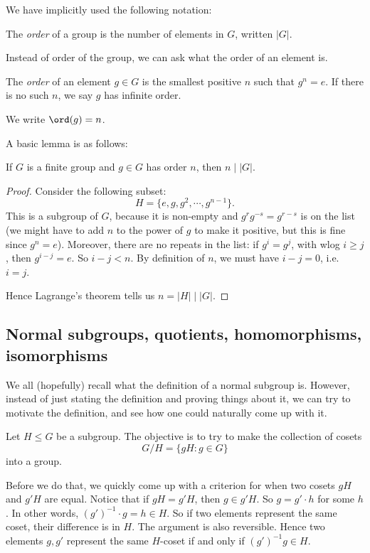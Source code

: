 \documentclass[a4paper]{article}
\begin{document}
We have implicitly used the following notation:
\begin{defi}
  The \emph{order} of a group is the number of elements in $G$, written $|G|$.
\end{defi}

Instead of order of the group, we can ask what the order of an element is.
\begin{defi}
  The \emph{order} of an element $g \in G$ is the smallest positive $n$ such that $g^n = e$. If there is no such $n$, we say $g$ has infinite order.

  We write $\ord(g) = n$.
\end{defi}

A basic lemma is as follows:
\begin{lemma}
  If $G$ is a finite group and $g \in G$ has order $n$, then $n \mid |G|$.
\end{lemma}

\begin{proof}
  Consider the following subset:
  \[
    H= \{e, g, g^2, \cdots, g^{n - 1}\}.
  \]
  This is a subgroup of $G$, because it is non-empty and $g^rg^{-s} = g^{r - s}$ is on the list (we might have to add $n$ to the power of $g$ to make it positive, but this is fine since $g^n = e$). Moreover, there are no repeats in the list: if $g^i = g^j$, with wlog $i \geq j$, then $g^{i - j} = e$. So $i - j < n$. By definition of $n$, we must have $i - j = 0$, i.e.\ $i = j$.

  Hence Lagrange's theorem tells us $n = |H| \mid |G|$.
\end{proof}

\subsection{Normal subgroups, quotients, homomorphisms, isomorphisms}
We all (hopefully) recall what the definition of a normal subgroup is. However, instead of just stating the definition and proving things about it, we can try to motivate the definition, and see how one could naturally come up with it.

Let $H \leq G$ be a subgroup. The objective is to try to make the collection of cosets
\[
  G/H = \{gH: g \in G\}
\]
into a group.

Before we do that, we quickly come up with a criterion for when two cosets $gH$ and $g'H$ are equal. Notice that if $gH = g'H$, then $g \in g'H$. So $g = g'\cdot h$ for some $h$. In other words, $(g')^{-1} \cdot g = h \in H$. So if two elements represent the same coset, their difference is in $H$. The argument is also reversible. Hence two elements $g, g'$ represent the same $H$-coset if and only if $(g')^{-1} g \in H$.
\end{document}
